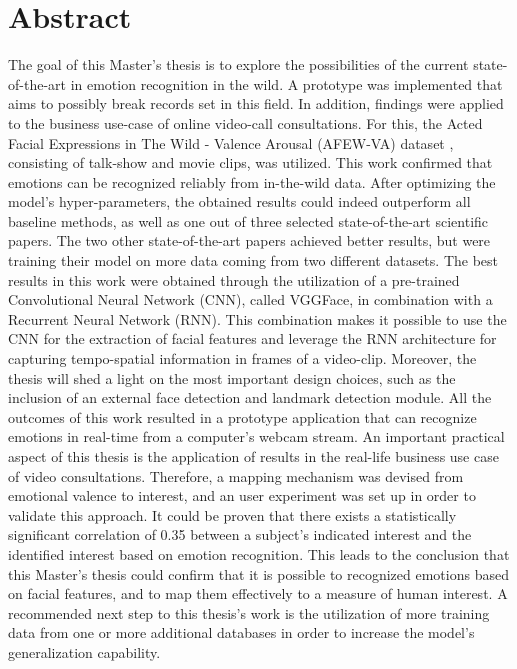 \documentclass[11pt,a4paper]{scrbook}
\begin{document}
\begin{titlepage}
\end{titlepage}

\restoregeometry



\chapter{Abstract}
The goal of this Master's thesis is to explore the possibilities of the current state-of-the-art in emotion recognition in the wild. A prototype was implemented that aims to possibly break records set in this field. In addition, findings were applied to the business use-case of online video-call consultations.
\newline\newline
For this, the Acted Facial Expressions in The Wild - Valence Arousal (AFEW-VA) dataset \citep{Kossaifi:2017:AFEW-VADatabase}, consisting of talk-show and movie clips, was utilized. This work confirmed that emotions can be recognized reliably from in-the-wild data. After optimizing the model's hyper-parameters, the obtained results could indeed outperform all baseline methods, as well as one out of three selected state-of-the-art scientific papers. The two other state-of-the-art papers achieved better results, but were training their model on more data coming from two different datasets.
\newline\newline
The best results in this work were obtained through the utilization of a pre-trained Convolutional Neural Network (CNN), called VGGFace, in combination with a Recurrent Neural Network (RNN). This combination makes it possible to use the CNN for the extraction of facial features and leverage the RNN architecture for capturing tempo-spatial information in frames of a video-clip. Moreover, the thesis will shed a light on the most important design choices, such as the inclusion of an external face detection and landmark detection module. All the outcomes of this work resulted in a prototype application that can recognize emotions in real-time from a computer's webcam stream.
\newline\newline
An important practical aspect of this thesis is the application of results in the real-life business use case of video consultations. Therefore, a mapping mechanism was devised from emotional valence to interest, and an user experiment was set up in order to validate this approach. It could be proven that there exists a statistically significant correlation of 0.35 between a subject's indicated interest and the identified interest based on emotion recognition. This leads to the conclusion that this Master's thesis could confirm that it is possible to recognized emotions based on facial features, and to map them effectively to a measure of human interest.
\newline\newline
A recommended next step to this thesis's work is the utilization of more training data from one or more additional databases in order to increase the model's generalization capability.
\end{document}
